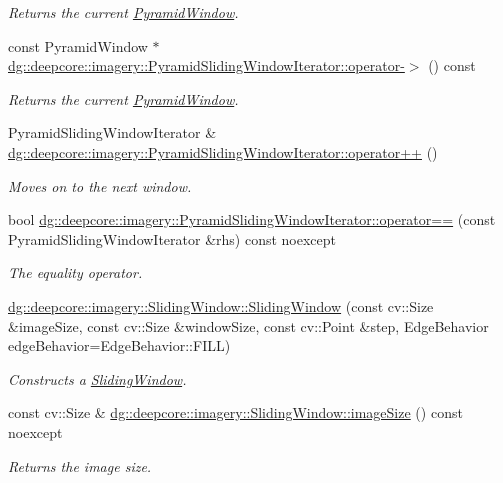 \begin{DoxyCompactItemize}
\begin{DoxyCompactList}\small\item\em Returns the current \hyperlink{structdg_1_1deepcore_1_1imagery_1_1_pyramid_window}{Pyramid\+Window}. \end{DoxyCompactList}\item 
const Pyramid\+Window $\ast$ \hyperlink{group___imagery_module_gac54e72b4aa8c5b92bc491c12aed242d0}{dg\+::deepcore\+::imagery\+::\+Pyramid\+Sliding\+Window\+Iterator\+::operator-\/$>$} () const 
\begin{DoxyCompactList}\small\item\em Returns the current \hyperlink{structdg_1_1deepcore_1_1imagery_1_1_pyramid_window}{Pyramid\+Window}. \end{DoxyCompactList}\item 
Pyramid\+Sliding\+Window\+Iterator \& \hyperlink{group___imagery_module_gaa6990163252dcca167db1dde03c55100}{dg\+::deepcore\+::imagery\+::\+Pyramid\+Sliding\+Window\+Iterator\+::operator++} ()
\begin{DoxyCompactList}\small\item\em Moves on to the next window. \end{DoxyCompactList}\item 
bool \hyperlink{group___imagery_module_gaa1566b49b13ee8b98e58d748aba156b3}{dg\+::deepcore\+::imagery\+::\+Pyramid\+Sliding\+Window\+Iterator\+::operator==} (const Pyramid\+Sliding\+Window\+Iterator \&rhs) const noexcept
\begin{DoxyCompactList}\small\item\em The equality operator. \end{DoxyCompactList}\item 
\hyperlink{group___imagery_module_gaac77ef4c080960674fcf6c0c25960a1d}{dg\+::deepcore\+::imagery\+::\+Sliding\+Window\+::\+Sliding\+Window} (const cv\+::\+Size \&image\+Size, const cv\+::\+Size \&window\+Size, const cv\+::\+Point \&step, Edge\+Behavior edge\+Behavior=Edge\+Behavior\+::\+F\+I\+LL)
\begin{DoxyCompactList}\small\item\em Constructs a \hyperlink{classdg_1_1deepcore_1_1imagery_1_1_sliding_window}{Sliding\+Window}. \end{DoxyCompactList}\item 
const cv\+::\+Size \& \hyperlink{group___imagery_module_ga2771aea9a69cec6529758e6315bf2088}{dg\+::deepcore\+::imagery\+::\+Sliding\+Window\+::image\+Size} () const noexcept
\begin{DoxyCompactList}\small\item\em Returns the image size. \end{DoxyCompactList}\item 

\end{DoxyCompactItemize}

